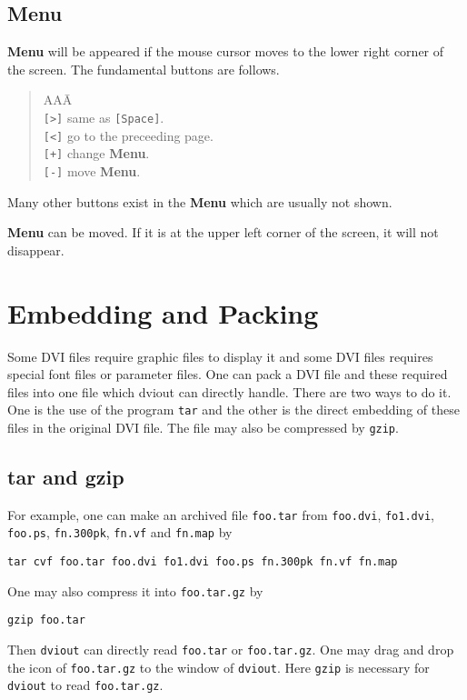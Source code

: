 \documentclass{article}
\begin{document}
\subsection{Menu}
{\bf Menu} will be appeared if the mouse cursor moves to the lower right corner
of the screen.  The fundamental buttons are follows.
\begin{quote}\begin{tabbing}
AAA\=\kill\\
{\tt [>]}\> same as {\tt[Space]}.\\
{\tt [<]}\> go to the preceeding page.\\
{\tt [+]}\> change {\bf Menu}.\\
{\tt [-]}\> move {\bf Menu}.\\
\end{tabbing}\end{quote}
Many other buttons exist in the {\bf Menu} which are usually not shown.

{\bf Menu} can be moved.
If it is at the upper left corner of the screen, it will not disappear.

\section{Embedding and Packing}
Some DVI files require graphic files to display it
and some DVI files requires special font files or
parameter files.
One can pack a DVI file and these required files into one
file which dviout can directly handle.
There are two ways to do it.  One is the use of the program 
{\tt tar} and the other is the direct embedding of these files in
the original DVI file.
The file may also be compressed by {\tt gzip}.

\subsection{tar and gzip}
For example, one can make an archived file {\tt foo.tar} from 
{\tt foo.dvi}, {\tt fo1.dvi}, {\tt foo.ps}, {\tt fn.300pk}, 
{\tt fn.vf} and {\tt fn.map} by
\begin{verbatim}
tar cvf foo.tar foo.dvi fo1.dvi foo.ps fn.300pk fn.vf fn.map
\end{verbatim}
One may also compress it into {\tt foo.tar.gz} by
\begin{verbatim}
gzip foo.tar
\end{verbatim}
Then {\tt dviout} can directly read {\tt foo.tar} or 
{\tt foo.tar.gz}.  One may drag and drop the icon of 
{\tt foo.tar.gz} to the window of {\tt dviout}.
Here {\tt gzip} is necessary for {\tt dviout} to read {\tt foo.tar.gz}.
\end{document}
